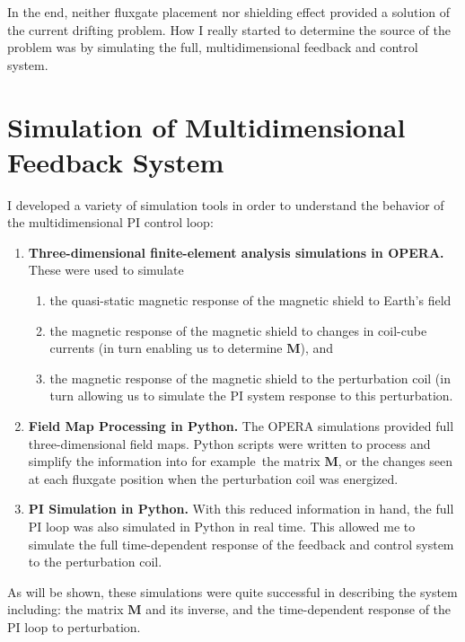 

In the end, neither fluxgate placement nor shielding effect provided a
solution of the current drifting problem.  How I really started to
determine the source of the problem was by simulating the full,
multidimensional feedback and control system.

\section{Simulation of Multidimensional Feedback System}\label{sec:pSim}

I developed a variety of simulation tools in order to understand the
behavior of the multidimensional PI control loop:
\begin{enumerate}
\item {\bf Three-dimensional finite-element analysis simulations in OPERA.}  These were used to simulate
\begin{enumerate}
\item the quasi-static magnetic response of the magnetic shield to Earth's field
\item the magnetic response of the magnetic shield to changes in coil-cube currents (in turn enabling us to determine $\bm{M}$), and
\item the magnetic response of the magnetic shield to the perturbation coil (in turn allowing us to simulate the PI system response to this perturbation.
\end{enumerate}
\item {\bf Field Map Processing in Python.}  The OPERA simulations provided full three-dimensional field maps.  Python scripts were written to process and simplify the information into for example~the matrix $\bm{M}$, or the changes seen at each fluxgate position when the perturbation coil was energized.
\item {\bf PI Simulation in Python.}  With this reduced information in hand, the full PI loop was also simulated in Python in real time.  This allowed me to simulate the full time-dependent response of the feedback and control system to the perturbation coil.
\end{enumerate}
As will be shown, these simulations were quite successful in
describing the system including: the matrix $\bm{M}$ and its
inverse, and the time-dependent response of the PI loop to
perturbation.

